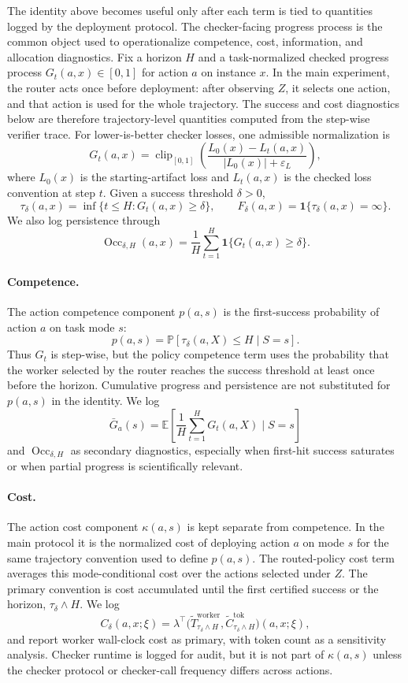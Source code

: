 \documentclass{article}
\DeclareMathOperator{\Occ}{Occ}
\newcommand{\E}{\mathbb{E}}
\newcommand{\Prb}{\mathbb{P}}
\newcommand{\eps}{\varepsilon}
\newcommand{\one}{\mathbf{1}}
\begin{document}
The identity above becomes useful only after each term is tied to quantities logged by the deployment protocol.
The checker-facing progress process is the common object used to operationalize competence, cost, information, and allocation diagnostics.
Fix a horizon $H$ and a task-normalized checked progress process $G_t(a,x)\in[0,1]$ for action $a$ on instance $x$.
In the main experiment, the router acts once before deployment: after observing $Z$, it selects one action, and that action is used for the whole trajectory.
The success and cost diagnostics below are therefore trajectory-level quantities computed from the step-wise verifier trace.
For lower-is-better checker losses, one admissible normalization is
\[
G_t(a,x)
=
\operatorname{clip}_{[0,1]}\!\left(
\frac{L_0(x)-L_t(a,x)}{|L_0(x)|+\eps_L}
\right),
\]
where $L_0(x)$ is the starting-artifact loss and $L_t(a,x)$ is the checked loss convention at step $t$.
Given a success threshold $\delta>0$,
\[
\tau_\delta(a,x)=\inf\{t\le H:G_t(a,x)\ge \delta\},
\qquad
F_\delta(a,x)=\one\{\tau_\delta(a,x)=\infty\}.
\]
We also log persistence through
\[
\Occ_{\delta,H}(a,x)=\frac{1}{H}\sum_{t=1}^H \one\{G_t(a,x)\ge \delta\}.
\]

\paragraph{Competence.}
The action competence component $p(a,s)$ is the first-success probability of action $a$ on task mode $s$:
\[
p(a,s)=\Prb[\tau_\delta(a,X)\le H\mid S=s].
\]
Thus $G_t$ is step-wise, but the policy competence term uses the probability that the worker selected by the router reaches the success threshold at least once before the horizon.
Cumulative progress and persistence are not substituted for $p(a,s)$ in the identity.
We log
\[
\bar G_a(s)=\E\!\left[\frac{1}{H}\sum_{t=1}^H G_t(a,X)\mid S=s\right]
\]
and $\Occ_{\delta,H}$ as secondary diagnostics, especially when first-hit success saturates or when partial progress is scientifically relevant.

\paragraph{Cost.}
The action cost component $\kappa(a,s)$ is kept separate from competence.
In the main protocol it is the normalized cost of deploying action $a$ on mode $s$ for the same trajectory convention used to define $p(a,s)$.
The routed-policy cost term averages this mode-conditional cost over the actions selected under $Z$.
The primary convention is cost accumulated until the first certified success or the horizon, $\tau_\delta\wedge H$.
We log
\[
C_\delta(a,x;\xi)
=
\lambda^\top
\bigl(
\widetilde T^{\mathrm{worker}}_{\tau_\delta\wedge H},
\widetilde C^{\mathrm{tok}}_{\tau_\delta\wedge H}
\bigr)(a,x;\xi),
\]
and report worker wall-clock cost as primary, with token count as a sensitivity analysis.
Checker runtime is logged for audit, but it is not part of $\kappa(a,s)$ unless the checker protocol or checker-call frequency differs across actions.
\end{document}
